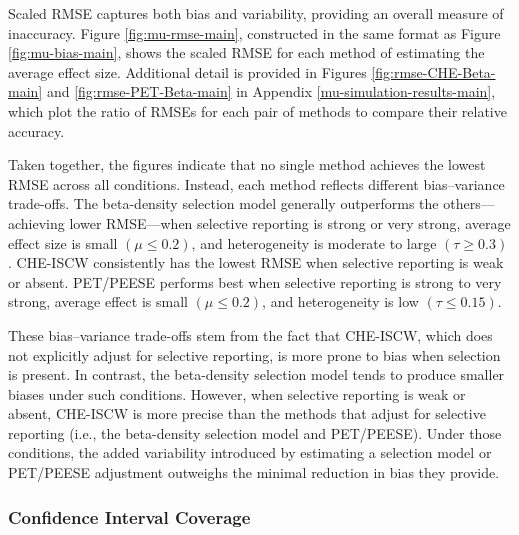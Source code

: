 \documentclass[
  man, donotrepeattitle,floatsintext]{apa7}
\begin{document}
Scaled RMSE captures both bias and variability, providing an overall measure of inaccuracy. Figure \ref{fig:mu-rmse-main}, constructed in the same format as Figure \ref{fig:mu-bias-main}, shows the scaled RMSE for each method of estimating the average effect size. Additional detail is provided in Figures \ref{fig:rmse-CHE-Beta-main} and \ref{fig:rmse-PET-Beta-main} in Appendix \ref{mu-simulation-results-main}, which plot the ratio of RMSEs for each pair of methods to compare their relative accuracy.

Taken together, the figures indicate that no single method achieves the lowest RMSE across all conditions. Instead, each method reflects different bias--variance trade-offs.
The beta-density selection model generally outperforms the others---achieving lower RMSE---when selective reporting is strong or very strong, average effect size is small \((\mu \leq 0.2)\), and heterogeneity is moderate to large \((\tau \geq 0.3)\).
CHE-ISCW consistently has the lowest RMSE when selective reporting is weak or absent.
PET/PEESE performs best when selective reporting is strong to very strong, average effect is small \((\mu \leq 0.2)\), and heterogeneity is low \((\tau \leq 0.15)\).

These bias--variance trade-offs stem from the fact that CHE-ISCW, which does not explicitly adjust for selective reporting, is more prone to bias when selection is present. In contrast, the beta-density selection model tends to produce smaller biases under such conditions. However, when selective reporting is weak or absent, CHE-ISCW is more precise than the methods that adjust for selective reporting (i.e., the beta-density selection model and PET/PEESE). Under those conditions, the added variability introduced by estimating a selection model or PET/PEESE adjustment outweighs the minimal reduction in bias they provide.

\subsubsection{Confidence Interval Coverage}\label{confidence-interval-coverage}
\end{document}
